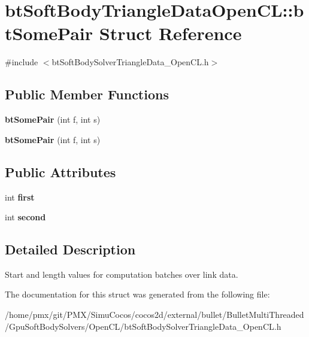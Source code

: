 \hypertarget{structbtSoftBodyTriangleDataOpenCL_1_1btSomePair}{}\section{bt\+Soft\+Body\+Triangle\+Data\+Open\+CL\+:\+:bt\+Some\+Pair Struct Reference}
\label{structbtSoftBodyTriangleDataOpenCL_1_1btSomePair}


{\ttfamily \#include $<$bt\+Soft\+Body\+Solver\+Triangle\+Data\+\_\+\+Open\+C\+L.\+h$>$}

\subsection*{Public Member Functions}
\begin{DoxyCompactItemize}
\item 
\mbox{\label{structbtSoftBodyTriangleDataOpenCL_1_1btSomePair_ab3fe41e6a20ee489aabd8d47b4d013c2}} 
{\bfseries bt\+Some\+Pair} (int f, int s)
\item 
\mbox{\label{structbtSoftBodyTriangleDataOpenCL_1_1btSomePair_ab3fe41e6a20ee489aabd8d47b4d013c2}} 
{\bfseries bt\+Some\+Pair} (int f, int s)
\end{DoxyCompactItemize}
\subsection*{Public Attributes}
\begin{DoxyCompactItemize}
\item 
\mbox{\label{structbtSoftBodyTriangleDataOpenCL_1_1btSomePair_a68a587fefa4bc96720878af0f1c3a157}} 
int {\bfseries first}
\item 
\mbox{\label{structbtSoftBodyTriangleDataOpenCL_1_1btSomePair_a78df6466d7daf32d7418c1ebb01e0908}} 
int {\bfseries second}
\end{DoxyCompactItemize}


\subsection{Detailed Description}
Start and length values for computation batches over link data. 

The documentation for this struct was generated from the following file\+:\begin{DoxyCompactItemize}
\item 
/home/pmx/git/\+P\+M\+X/\+Simu\+Cocos/cocos2d/external/bullet/\+Bullet\+Multi\+Threaded/\+Gpu\+Soft\+Body\+Solvers/\+Open\+C\+L/bt\+Soft\+Body\+Solver\+Triangle\+Data\+\_\+\+Open\+C\+L.\+h\end{DoxyCompactItemize}

